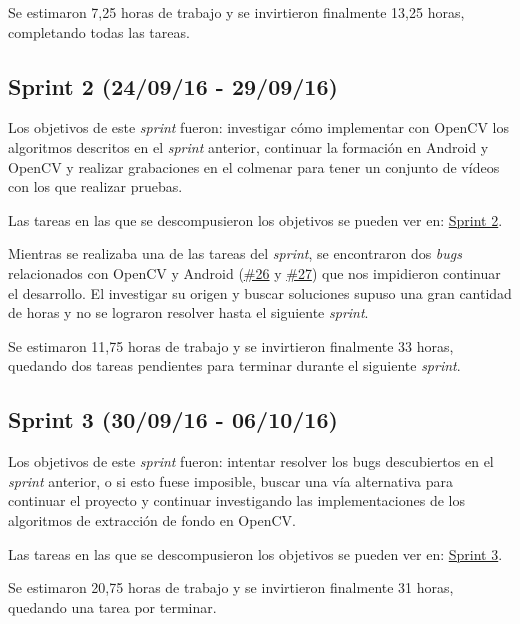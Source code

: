 Se estimaron 7,25 horas de trabajo y se invirtieron finalmente 13,25
horas, completando todas las tareas.


\subsection{Sprint 2 (24/09/16 -
29/09/16)}\label{sprint-2-240916---290916}

Los objetivos de este \emph{sprint} fueron: investigar cómo implementar
con OpenCV los algoritmos descritos en el \emph{sprint} anterior,
continuar la formación en Android y OpenCV y realizar grabaciones en el
colmenar para tener un conjunto de vídeos con los que realizar pruebas.

Las tareas en las que se descompusieron los objetivos se pueden ver en:
\href{https://github.com/davidmigloz/go-bees/milestone/3?closed=1}{Sprint
2}.

Mientras se realizaba una de las tareas del \emph{sprint}, se
encontraron dos \emph{bugs} relacionados con OpenCV y Android
(\href{https://github.com/davidmigloz/go-bees/issues/26}{\#26} y
\href{https://github.com/davidmigloz/go-bees/issues/27}{\#27}) que nos
impidieron continuar el desarrollo. El investigar su origen y buscar
soluciones supuso una gran cantidad de horas y no se lograron resolver
hasta el siguiente \emph{sprint}.

Se estimaron 11,75 horas de trabajo y se invirtieron finalmente 33
horas, quedando dos tareas pendientes para terminar durante el siguiente
\emph{sprint}.


\subsection{Sprint 3 (30/09/16 -
06/10/16)}\label{sprint-3-300916---061016}

Los objetivos de este \emph{sprint} fueron: intentar resolver los bugs
descubiertos en el \emph{sprint} anterior, o si esto fuese imposible,
buscar una vía alternativa para continuar el proyecto y continuar
investigando las implementaciones de los algoritmos de extracción de
fondo en OpenCV.

Las tareas en las que se descompusieron los objetivos se pueden ver en:
\href{https://github.com/davidmigloz/go-bees/milestone/4?closed=1}{Sprint
3}.

Se estimaron 20,75 horas de trabajo y se invirtieron finalmente 31
horas, quedando una tarea por terminar.

